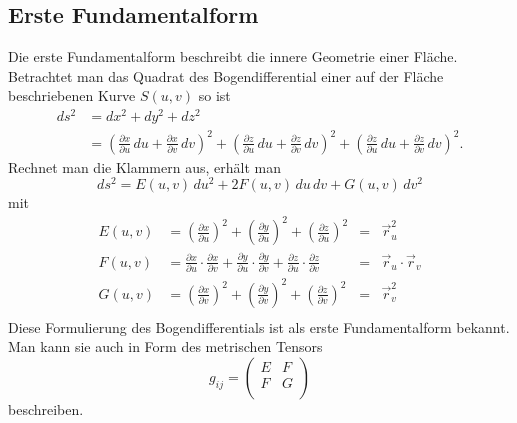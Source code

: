 \subsection{Erste Fundamentalform
\label{mongeampere:subsection:finibus}}
Die erste Fundamentalform beschreibt die innere Geometrie einer Fläche.
Betrachtet man das Quadrat des Bogendifferential einer auf der Fläche 
beschriebenen Kurve $S(u,v)$ so ist 
\begin{equation}
  \begin{split}
    d s^2 &= d x^2 + d y^2 + d z^2 \\
          &= \left(\frac{\partial x}{\partial u}\,d u + \frac{\partial x}{\partial v}\,d v  \right)^2
          + \left(\frac{\partial z}{\partial u}\,d u + \frac{\partial z}{\partial v}\,d v  \right)^2
          + \left(\frac{\partial z}{\partial u}\,d u + \frac{\partial z}{\partial v}\,d v  \right)^2.
  \end{split}
  \label{mongeampere:bogdiff}
\end{equation}
Rechnet man die Klammern aus, erhält man 
\begin{equation}
    d s^2 = E(u,v) \,d u^2 + 2F(u,v) \,d u \,d v + G(u,v)\,d v^2
    \label{mongeampere:1fundform}
\end{equation}
mit
\begin{equation*}
\begin{aligned}
     E(u,v) &= \left(\frac{\partial x}{\partial u} \right)^2 +
     \left(\frac{\partial y}{\partial u} \right)^2 +
     \left(\frac{\partial z}{\partial u} \right)^2 
            &=& \vec r_u^2\\
     F(u,v) &= 
     \frac{\partial x}{\partial u} \cdot \frac{\partial x}{\partial v} +
     \frac{\partial y}{\partial u} \cdot \frac{\partial y}{\partial v} +
     \frac{\partial z}{\partial u} \cdot \frac{\partial z}{\partial v}
            &=& \vec r_u \cdot \vec r_v \\
      G(u,v) &= \left(\frac{\partial x}{\partial v} \right)^2 +
     \left(\frac{\partial y}{\partial v} \right)^2 +
     \left(\frac{\partial z}{\partial v} \right)^2 
             &=& \vec r_v ^2\\
  \label{mongeampere:1fundbed}
\end{aligned}
\end{equation*}
Diese Formulierung des Bogendifferentials ist als erste Fundamentalform bekannt.
Man kann sie auch in Form des metrischen Tensors 
\begin{equation}
  g_{ij} = \begin{pmatrix}
    E & F \\
    F & G \\
  \end{pmatrix}
  \label{mongeampere:erstmettens}
\end{equation}
beschreiben.


